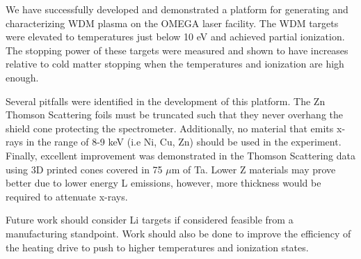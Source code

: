 We have successfully developed and demonstrated a platform for generating and characterizing WDM plasma on the OMEGA laser facility. The WDM targets were elevated to temperatures just below 10 eV and achieved partial ionization. The stopping power of these targets were measured and shown to have increases relative to cold matter stopping when the temperatures and ionization are high enough.

Several pitfalls were identified in the development of this platform. The Zn Thomson Scattering foils must be truncated such that they never overhang the shield cone protecting the spectrometer. Additionally, no material that emits x-rays in the range of 8-9 keV (i.e Ni, Cu, Zn) should be used in the experiment. Finally, excellent improvement was demonstrated in the Thomson Scattering data using 3D printed cones covered in 75 $\mu$m of Ta. Lower Z materials may prove better due to lower energy L emissions, however, more thickness would be required to attenuate x-rays. 

Future work should consider Li targets if considered feasible from a manufacturing standpoint. Work should also be done to improve the efficiency of the heating drive to push to higher temperatures and ionization states.